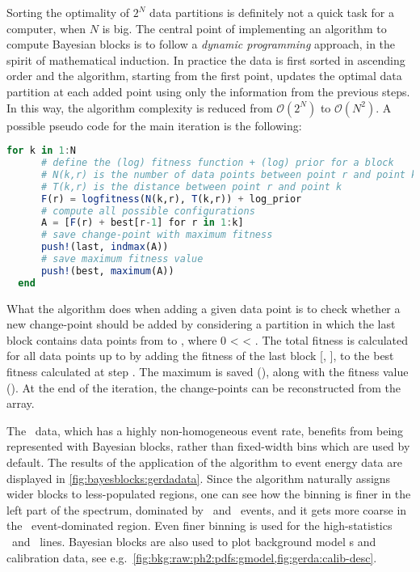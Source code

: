 Sorting the optimality of $2^N$ data partitions is definitely not a quick task for a
computer, when $N$ is big. The central point of implementing an algorithm to compute
Bayesian blocks is to follow a \emph{dynamic programming} approach, in the spirit of
mathematical induction. In practice the data is first sorted in ascending order and the
algorithm, starting from the first point, updates the optimal data partition at each added
point using only the information from the previous steps. In this way, the algorithm
complexity is reduced from $\mathcal{O}(2^N)$ to $\mathcal{O}(N^2)$. A possible pseudo
code for the main iteration is the following:
\begin{lstlisting}[language=julia, style=jlcodestyle]
  for k in 1:N
      # define the (log) fitness function + (log) prior for a block
      # N(k,r) is the number of data points between point r and point k
      # T(k,r) is the distance between point r and point k
      F(r) = logfitness(N(k,r), T(k,r)) + log_prior
      # compute all possible configurations
      A = [F(r) + best[r-1] for r in 1:k]
      # save change-point with maximum fitness
      push!(last, indmax(A))
      # save maximum fitness value
      push!(best, maximum(A))
  end
\end{lstlisting}
What the algorithm does when adding a given data point  is to check whether a new
change-point should be added by considering a partition in which the last block contains
data points from  to , where 0 <  < . The total fitness is calculated
for all data points up to  by adding the fitness of the last block [, ], to
the best fitness calculated at step . The maximum is saved (), along with the
fitness value (). At the end of the iteration, the change-points can be
reconstructed from the  array.

The \gerda\ data, which has a highly non-homogeneous event rate, benefits from being
represented with Bayesian blocks, rather than fixed-width bins which are used by default.
The results of the application of the algorithm to event energy data are displayed in
\cref{fig:bayesblocks:gerdadata}. Since the algorithm naturally assigns wider blocks to
less-populated regions, one can see how the binning is finer in the left part of the
spectrum, dominated by \Arl\ and \nnbb\ events, and it gets more coarse in the \a\
event-dominated region. Even finer binning is used for the high-statistics \kvn\ and \kvz\
lines. Bayesian blocks are also used to plot background model \pdf{}s and calibration data,
see e.g.~\cref{fig:bkg:raw:ph2:pdfs:gmodel,fig:gerda:calib-desc}.

